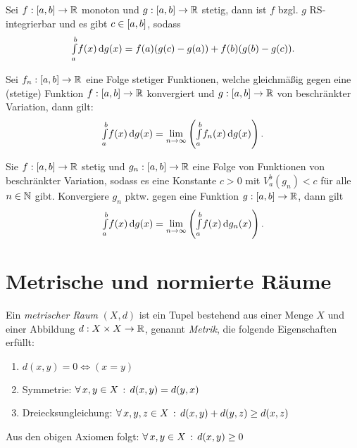 \documentclass{cheat-sheet}
\begin{document}
\begin{satz}
  Sei $f : \left[ a, b \right] \to \mathbb{R}$ monoton und $g : \left[ a, b \right] \to \mathbb{R}$ stetig, dann ist $f$ bzgl. $g$ RS-integrierbar und es gibt $c \in \left[ a, b \right]$, sodass
  \[ {\textstyle \int\limits_{a}^{b}} f(x) \,\mathrm{d} g(x) = f(a)(g(c) - g(a)) + f(b)(g(b) - g(c)). \]
\end{satz}

\begin{satz}
  Sei $f_n : \left[ a, b \right] \to \mathbb{R}$ eine Folge stetiger Funktionen, welche gleichmäßig gegen eine (stetige) Funktion $f : \left[ a, b \right] \to \mathbb{R}$ konvergiert und $g : \left[ a, b \right] \to \mathbb{R}$ von beschränkter Variation, dann gilt:
  \[ {\textstyle \int\limits_{a}^{b}} f(x) \,\mathrm{d} g(x) = \lim_{n \to \infty} \left({\textstyle \int\limits_{a}^{b}} f_n(x) \,\mathrm{d} g(x)\right). \]
\end{satz}

\begin{satz}
  Sie $f : \left[ a, b \right] \to \mathbb{R}$ stetig und $g_n : \left[ a, b \right] \to \mathbb{R}$ eine Folge von Funktionen von beschränkter Variation, sodass es eine Konstante $c > 0$ mit $V_a^b(g_n) < c$ für alle $n \in \mathbb{N}$ gibt. Konvergiere $g_n$ pktw. gegen eine Funktion $g : \left[ a, b \right] \to \mathbb{R}$, dann gilt
  \[ {\textstyle \int\limits_{a}^{b}} f(x) \,\mathrm{d} g(x) = \lim_{n \to \infty} \left({\textstyle \int\limits_{a}^{b}} f(x) \,\mathrm{d} g_n(x)\right). \]
\end{satz}


\section{Metrische und normierte Räume}

\begin{defn}
  Ein \emph{metrischer Raum} $(X, d)$ ist ein Tupel bestehend aus einer Menge $X$ und einer Abbildung $d : X \times X \to \mathbb{R}$, genannt \emph{Metrik}, die folgende Eigenschaften erfüllt:

  \begin{enumerate}
    \item $d(x, y) = 0 \iff (x = y)$
    \item Symmetrie: $\forall \, {x, y \in X} \,:\, d(x, y) = d(y, x)$
    \item Dreiecksungleichung: $\forall \, {x, y, z \in X} \,:\, d(x, y) + d(y, z) \ge d(x, z)$
  \end{enumerate}
\end{defn}

\begin{bem}
  Aus den obigen Axiomen folgt: $\forall \, {x, y \in X} \,:\, d(x, y) \ge 0$
\end{bem}
\end{document}
